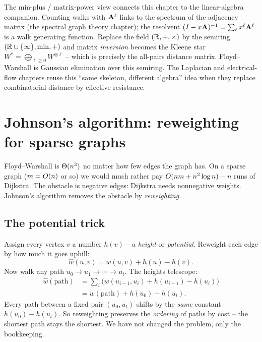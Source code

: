 \begin{connectionbox}
The min-plus / matrix-power view connects this chapter to the linear-algebra companion. Counting walks with
$\mathbf{A}^\ell$ links to the spectrum of the adjacency matrix (the spectral graph theory chapter); the
resolvent $(I-x\mathbf{A})^{-1}=\sum_\ell x^\ell \mathbf{A}^\ell$ is a walk generating function. Replace the field
$(\mathbb{R},+,\times)$ by the semiring $(\mathbb{R}\cup\{\infty\},\min,+)$ and matrix \emph{inversion} becomes the
Kleene star $W^*=\bigoplus_{\ell\ge 0}W^{\otimes\ell}$ -- which is precisely the all-pairs distance
matrix. Floyd--Warshall is Gaussian elimination over this semiring. The Laplacian and electrical-flow
chapters reuse this ``same skeleton, different algebra'' idea when they replace combinatorial distance by
effective resistance.
\end{connectionbox}

\section{Johnson's algorithm: reweighting for sparse graphs}
\label{ch09:johnson}

Floyd--Warshall is $\Theta(n^3)$ no matter how few edges the graph has. On a sparse graph ($m=O(n)$ or
so) we would much rather pay $O(nm+n^2\log n)$ -- $n$ runs of Dijkstra. The obstacle is negative edges:
Dijkstra needs nonnegative weights. Johnson's algorithm removes the obstacle by \emph{reweighting}.

\subsection{The potential trick}

\begin{intuitionbox}
Assign every vertex $v$ a number $h(v)$ -- a \emph{height} or \emph{potential}. Reweight each edge by how
much it goes uphill:
\[
  \hat{w}(u,v) = w(u,v) + h(u) - h(v).
\]
Now walk any path $u_0\to u_1\to\cdots\to u_t$. The heights telescope:
\begin{align*}
  \hat{w}(\text{path}) &= \sum_{i}\big(w(u_{i-1},u_i)+h(u_{i-1})-h(u_i)\big) \\
   &= w(\text{path}) + h(u_0) - h(u_t).
\end{align*}
Every path between a fixed pair $(u_0,u_t)$ shifts by the \emph{same} constant $h(u_0)-h(u_t)$. So
reweighting preserves the \emph{ordering} of paths by cost -- the shortest path stays the shortest. We
have not changed the problem, only the bookkeeping.
\end{intuitionbox}

